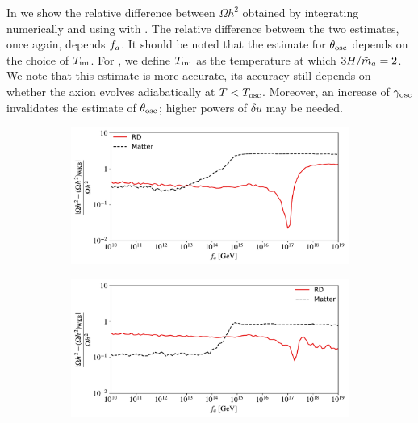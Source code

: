 \documentclass[11pt,a4paper]{article}
\begin{document}
In  we show the relative difference between $\Omega h^2$ obtained by integrating numerically   and using  with . The relative difference between the two estimates, once again, depends $f_{a}{}$. It should be noted that the estimate for $\theta_{\rm osc}{}$ depends on the choice of $T_{\rm ini}{}$. For , we define $T_{\rm ini}{}$ as the temperature at which $3H/\tilde m_{a}{} = 2$. We note that this estimate is more accurate, its accuracy still depends on whether the axion evolves adiabatically at $T<T_{\rm osc}{}$. Moreover, an increase of $\gamma_{\rm osc}$ invalidates the estimate of $\theta_{\rm osc}{}$; higher powers of $\delta u$ may be needed.    
%
\begin{figure}[t]
	\begin{subfigure}[]{0.5\textwidth}
		\includegraphics[width=1\textwidth]{figs/WKB_diff_i.pdf}
		\caption{}
		\label{fig:WKB_diff_i}
	\end{subfigure}
	\begin{subfigure}[]{0.5\textwidth}
		\includegraphics[width=1\textwidth]{figs/WKB_diff_osc.pdf}
		\caption{}
		\label{fig:WKB_diff_osc}
	\end{subfigure}
	\begin{center}
	\begin{subfigure}[]{0.5\textwidth}

\end{subfigure}
\end{center}
\end{figure}
\end{document}
